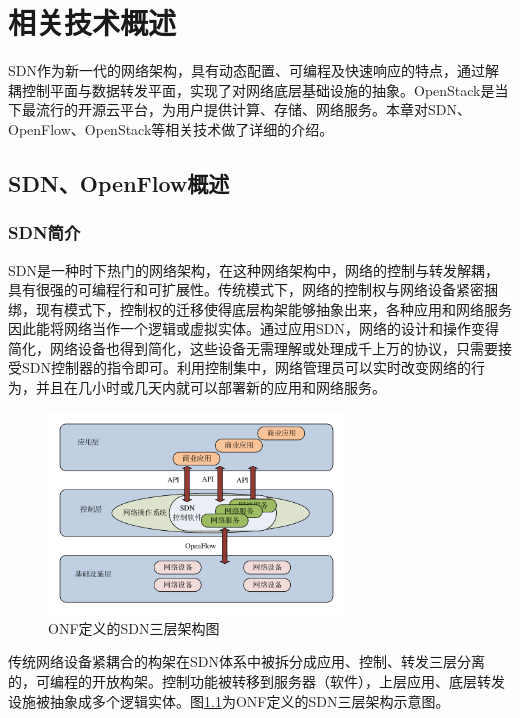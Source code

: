 
\chapter{相关技术概述}
SDN作为新一代的网络架构，具有动态配置、可编程及快速响应的特点，通过解耦控制平面与数据转发平面，实现了对网络底层基础设施的抽象。OpenStack是当下最流行的开源云平台，为用户提供计算、存储、网络服务。本章对SDN、OpenFlow、OpenStack等相关技术做了详细的介绍。
\section{SDN、OpenFlow概述}
\subsection{SDN简介}
SDN是一种时下热门的网络架构，在这种网络架构中，网络的控制与转发解耦，具有很强的可编程行和可扩展性。传统模式下，网络的控制权与网络设备紧密捆绑，现有模式下，控制权的迁移使得底层构架能够抽象出来，各种应用和网络服务因此能将网络当作一个逻辑或虚拟实体。通过应用SDN，网络的设计和操作变得简化，网络设备也得到简化，这些设备无需理解或处理成千上万的协议，只需要接受SDN控制器的指令即可。利用控制集中，网络管理员可以实时改变网络的行为，并且在几小时或几天内就可以部署新的应用和网络服务。

\begin{figure}[!htb]
  \centering
  \includegraphics[width=0.7\textwidth]{logo/sdn}
  \caption{ONF定义的SDN三层架构图}
  \label{fig:sdn}
\end{figure}

传统网络设备紧耦合的构架在SDN体系中被拆分成应用、控制、转发三层分离的，可编程的开放构架。控制功能被转移到服务器（软件），上层应用、底层转发设施被抽象成多个逻辑实体。图\ref{fig:sdn}为ONF定义的SDN三层架构示意图。


